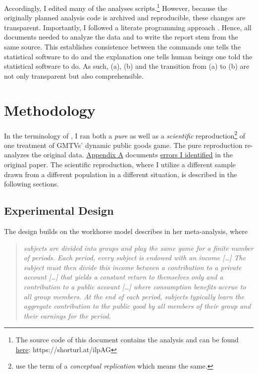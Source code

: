 \documentclass[
  authoryear,
  review,
  3p,
  onecolumn]{elsarticle}
\begin{document}
Accordingly, I edited many of the analyses scripts.\footnote{The source
  code of this document contains the analysis and can be found
  \href{https://github.com/Howquez/coopUncertainty/blob/main/analysis/quarto/paper.qmd}{here}:
  https://shorturl.at/ilpAG} However, because the originally planned
analysis code is archived and reproducible, these changes are
transparent. Importantly, I followed a literate programming approach
\citep{Knuth_1984, AkhtarYe_2023}. Hence, all documents needed to
analyze the data and to write the report stem from the same source. This
establishes consistence between the commands one tells the statistical
software to do and the explanation one tells human beings one told the
statistical software to do. As such, (a), (b) and the transition from
(a) to (b) are not only transparent but also comprehensible.

\hypertarget{sec-methods}{%
\section{Methodology}\label{sec-methods}}

In the terminology of \citet{Hamermesh2007}, I ran both a \emph{pure} as
well as a \emph{scientific} reproduction\footnote{\citet{Parsons2022}
  use the term of a \emph{conceptual replication} which means the same.}
of one treatment of GMTVs' dynamic public goods game. The pure
reproduction re-analyzes the original data.
\protect\hyperlink{A:-Pure-Replication}{Appendix A} documents
\href{}{errors I identified} in the original paper. The scientific
reproduction, where I utilize a different sample drawn from a different
population in a different situation, is described in the following
sections.

\hypertarget{sec-design}{%
\subsection{Experimental Design}\label{sec-design}}

The design builds on the workhorse model \citet[p.301]{Zelmer2003}
describes in her meta-analysis, where

\begin{quote}
\emph{subjects are divided into groups and play the same game for a
finite number of periods. Each period, every subject is endowed with an
income {[}\ldots{]} The subject must then divide this income between a
contribution to a private account {[}\ldots{]} that yields a constant
return to themselves only and a contribution to a public account
{[}\ldots{]} where consumption benefits accrue to all group members. At
the end of each period, subjects typically learn the aggregate
contribution to the public good by all members of their group and their
earnings for the period.}
\end{quote}
\end{document}
